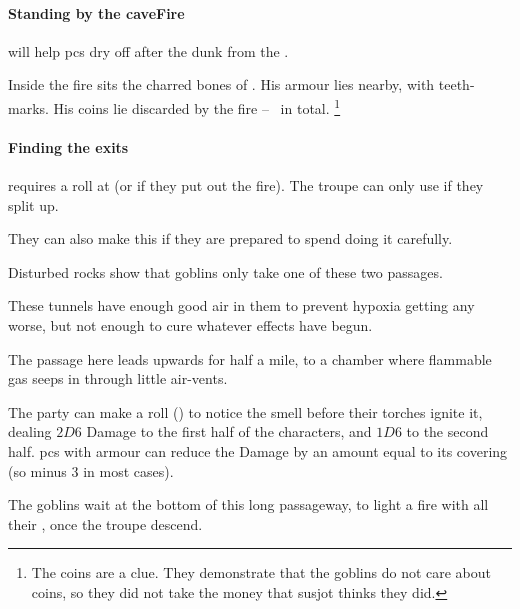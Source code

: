 \begin{multicols}{2}
\paragraph{Standing by the \gls{caveFire}}
will help \glspl{pc} dry off after the dunk from the .

Inside the fire sits the charred bones of .
His armour lies nearby, with teeth-marks.
His coins lie discarded by the fire -- \lootSmall\ in total.%
\footnote{The coins are a clue.  They demonstrate that the goblins do not care about coins, so they did not take the money that \gls{susjot} thinks they did.}
\label{caveCoinsII}
\setcounter{diceNo}{0}%
\renewcommand\npcsymbol{\currency}

\paragraph{Finding the exits}
requires a  roll at \tn[9] (or \tn[14] if they put out the fire).
The troupe can only use  if they split up.

They can also make this  if they are prepared to spend  doing it carefully.


Disturbed rocks show that goblins only take one of these two passages.

These tunnels have enough good air in them to prevent \gls{hypoxia} getting any worse, but not enough to cure whatever effects have begun.


The passage here leads upwards for half a mile, to a chamber where flammable gas seeps in through little air-vents.

The party can make a  roll (\tn[12]) to notice the smell before their torches ignite it, dealing $2D6$ Damage to the first half of the characters, and $1D6$ to the second half.
\Glspl{pc} with armour can reduce the Damage by an amount equal to its \gls{covering} (so minus 3 in most cases).



The goblins wait at the bottom of this long passageway, to light a fire with all their \fireFuel, once the troupe descend.


\end{multicols}
